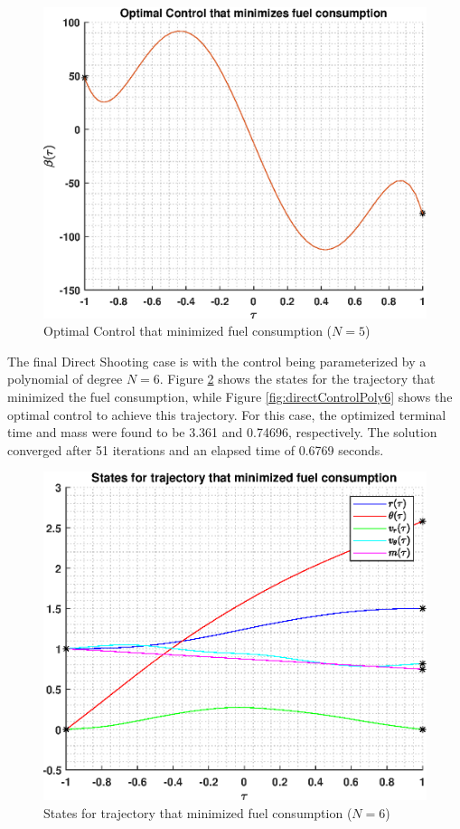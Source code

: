 \documentclass[]{article}
\begin{document}
\begin{figure}
	\centering
	\includegraphics[scale=0.75]{directControlPoly5.eps}
	\caption{Optimal Control that minimized fuel consumption (\(N = 5\))}
	\label{fig:directControlPoly5}
\end{figure}
\vspace{2mm}\newline 
The final Direct Shooting case is with the control being parameterized by a polynomial of degree \(N = 6\). Figure \ref{fig:directStatesPoly6} shows the states for the trajectory that minimized the fuel consumption, while Figure \ref{fig:directControlPoly6} shows the optimal control to achieve this trajectory. For this case, the optimized terminal time and mass were found to be 3.361 and 0.74696, respectively. The solution converged after 51 iterations and an elapsed time of 0.6769 seconds.
\begin{figure}
	\centering
	\includegraphics[scale=0.75]{directStatesPoly6.eps}
	\caption{States for trajectory that minimized fuel consumption (\(N = 6\))}
	\label{fig:directStatesPoly6}
\end{figure}
\end{document}
